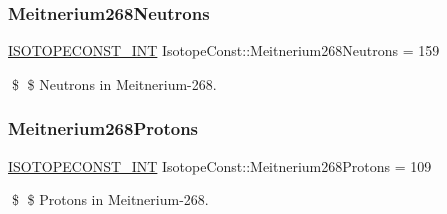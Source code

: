 \subsubsection{\texorpdfstring{Meitnerium268\+Neutrons}{Meitnerium268Neutrons}}
{\footnotesize\ttfamily \mbox{\hyperlink{group___isotope_const-_macros_ga5f18360b3e99483a35c32d789e62621c}{I\+S\+O\+T\+O\+P\+E\+C\+O\+N\+S\+T\+\_\+\+I\+NT}} Isotope\+Const\+::\+Meitnerium268\+Neutrons = 159}

\$ \$ Neutrons in Meitnerium-\/268. \mbox{\label{group___isotope_const-_meitnerium-_mt268_ga858246ebfbd8446c7c82bc2666427508}} 
\subsubsection{\texorpdfstring{Meitnerium268\+Protons}{Meitnerium268Protons}}
{\footnotesize\ttfamily \mbox{\hyperlink{group___isotope_const-_macros_ga5f18360b3e99483a35c32d789e62621c}{I\+S\+O\+T\+O\+P\+E\+C\+O\+N\+S\+T\+\_\+\+I\+NT}} Isotope\+Const\+::\+Meitnerium268\+Protons = 109}

\$ \$ Protons in Meitnerium-\/268. 